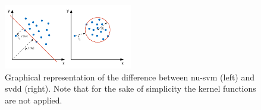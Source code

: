 \begin{figure}
  \centering
    \includegraphics[width=0.5\textwidth,keepaspectratio]{./Figures/chapter3/nu-vs-svdd.pdf}
  \caption[Difference \gls{nu-svm} and \gls{svdd}]{Graphical representation of the difference between \gls{nu-svm} (left) and \gls{svdd} (right). Note that for the sake of simplicity the kernel functions are not applied.}
  \label{fig:nu-vs-svdd}
\end{figure}

